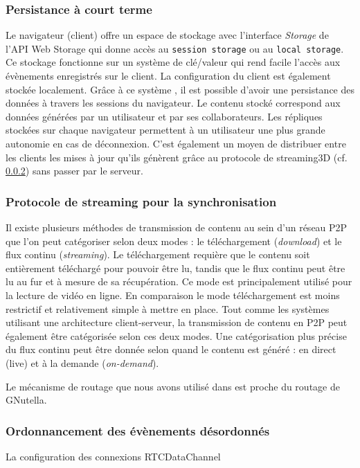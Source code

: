 \subsubsection{Persistance à court terme}
Le navigateur (client) offre un espace de stockage avec l'interface \textit{Storage} 
de l'API Web Storage qui donne accès au \texttt{session storage} ou au  
\texttt{local storage}. Ce stockage fonctionne sur un système de clé/valeur qui rend facile l'accès aux 
évènements enregistrés sur le client. La configuration du client est également 
stockée localement. Grâce à ce système , il est possible d'avoir une 
persistance des données à travers les sessions du navigateur. Le contenu stocké 
correspond aux données générées par un utilisateur et par ses collaborateurs. Les 
répliques stockées sur chaque navigateur permettent à un utilisateur une plus 
grande 
autonomie en cas de déconnexion. C'est également un moyen de distribuer entre les clients les 
mises à jour qu'ils génèrent grâce au protocole de 
\gls{streaming3D} (cf. \ref{streamingprotocol}) sans passer par le serveur.



\subsubsection{Protocole de streaming pour la synchronisation}
\label{streamingprotocol}

Il existe plusieurs méthodes de transmission de contenu au sein d'un réseau P2P 
que l'on peut catégoriser selon deux modes : le téléchargement (\textit{download}) 
et le flux continu (\textit{streaming}). Le téléchargement requière que le contenu 
soit entièrement téléchargé pour pouvoir être lu, tandis que le flux continu peut 
être lu au fur et à mesure de sa récupération. Ce mode est principalement utilisé 
pour la lecture de vidéo en ligne. En comparaison le mode téléchargement est 
moins restrictif et relativement simple à mettre en place. Tout comme les 
systèmes utilisant une architecture client-serveur, la transmission de contenu en 
P2P peut également être catégorisée selon ces deux modes. Une catégorisation 
plus précise du flux continu peut être donnée selon quand le contenu est généré : 
en direct (live) et à la demande (\textit{on-demand}).


Le mécanisme de routage que nous avons utilisé dans \cite{Desprat2015a} est 
proche du routage de GNutella. 



\subsubsection{Ordonnancement des évènements désordonnés}
La configuration des connexions RTCDataChannel 




